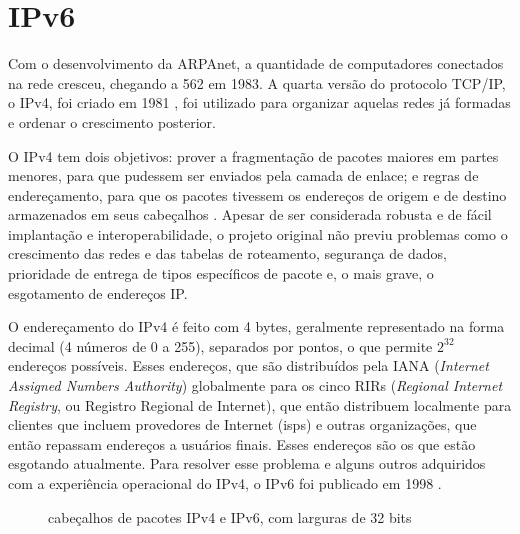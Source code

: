 
\section{IPv6}

\begin{comment}
O IPv6 é a versão mais recente do protocolo de Internet (IP), que foi criado para
substituir o IPv4, que atualmente é mais o usado porém sofre de exaustão de endereços.
Nesta seção, falarei sobre o novo protocolo e quais as implicações na programação de
softwares com comunicação de redes.
\end{comment}

Com o desenvolvimento da ARPAnet, a quantidade de computadores conectados na rede
cresceu, chegando a 562 em 1983. A quarta versão do protocolo TCP/IP, o IPv4, foi
criado em 1981 \cite{site:rfcipv4}, foi utilizado para organizar aquelas redes já
formadas e ordenar o crescimento posterior.

O IPv4 tem dois objetivos: prover a fragmentação de pacotes maiores em partes menores,
para que pudessem ser enviados pela camada de enlace; e regras de endereçamento, para
que os pacotes tivessem os endereços de origem e de destino armazenados em seus
cabeçalhos \cite{site:nicipv4}. Apesar de ser considerada robusta e de fácil
implantação e interoperabilidade, o projeto original não previu problemas como o
crescimento das redes e das tabelas de roteamento, segurança de dados, prioridade de
entrega de tipos específicos de pacote e, o mais grave, o esgotamento de endereços IP.

O endereçamento do IPv4 é feito com 4 bytes, geralmente representado na forma decimal
(4 números de 0 a 255), separados por pontos, o que permite $2^32$ endereços possíveis.
Esses endereços, que são distribuídos pela IANA
(\emph{Internet Assigned Numbers Authority}) globalmente para os cinco RIRs
(\emph{Regional Internet Registry}, ou Registro Regional de Internet), que então
distribuem localmente para clientes que incluem provedores de Internet (\glspl{isp}) e
outras organizações, que então repassam endereços a usuários finais. Esses endereços
são os que estão esgotando atualmente. Para resolver esse problema e alguns outros
adquiridos com a experiência operacional do IPv4, o IPv6 foi publicado em 1998
\cite{site:rfcipv6}.


\begin{figure}[H]
    \centering
    \caption{cabeçalhos de pacotes IPv4 e IPv6, com larguras de 32 bits}
    \label{fig:headers}
\end{figure}